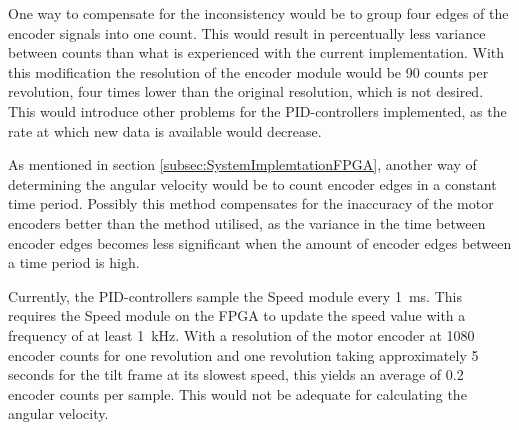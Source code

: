\documentclass[../../main.tex]{subfiles}
\begin{document}
One way to compensate for the inconsistency would be to group four edges of the encoder signals into one count. This would result in percentually less variance between counts than what is experienced with the current implementation. With this modification the resolution of the encoder module would be 90 counts per revolution, four times lower than the original resolution, which is not desired. This would introduce other problems for the PID-controllers implemented, as the rate at which new data is available would decrease.


As mentioned in section \ref{subsec:SystemImplemtationFPGA}, another way of determining the angular velocity would be to count encoder edges in a constant time period. Possibly this method compensates for the inaccuracy of the motor encoders better than the method utilised, as the variance in the time between encoder edges becomes less significant when the amount of encoder edges between a time period is high. 

Currently, the PID-controllers sample the Speed module every \SI{1}{\milli \second}. This requires the Speed module on the FPGA to update the speed value with a frequency of at least \SI{1}{\kilo\hertz}. With a resolution of the motor encoder at 1080 encoder counts for one revolution and one revolution taking approximately 5 seconds for the tilt frame at its slowest speed, this yields an average of 0.2 encoder counts per sample. This would not be adequate for calculating the angular velocity. 

\end{document}
